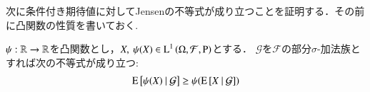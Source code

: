 	次に条件付き期待値に対してJensenの不等式が成り立つことを証明する．その前に凸関数の性質を書いておく. 
	\begin{thm}[Jensenの不等式]
		$\psi: \mathbb{R} \rightarrow \mathbb{R}$を凸関数とし，$X,\ \psi(X) \in \operatorname{L}^{1} \left(\Omega, \mathcal{F}, \operatorname{P}\right)$とする．
		$\mathcal{G}$を$\mathcal{F}$の部分$\sigma$-加法族とすれば次の不等式が成り立つ:
		\begin{align}
			\operatorname{E} \left[ \psi(X) \ \middle|\ \mathcal{G} \right] \geq \psi(\operatorname{E} \left[ X \ \middle|\ \mathcal{G} \right])
		\end{align}
	\end{thm}